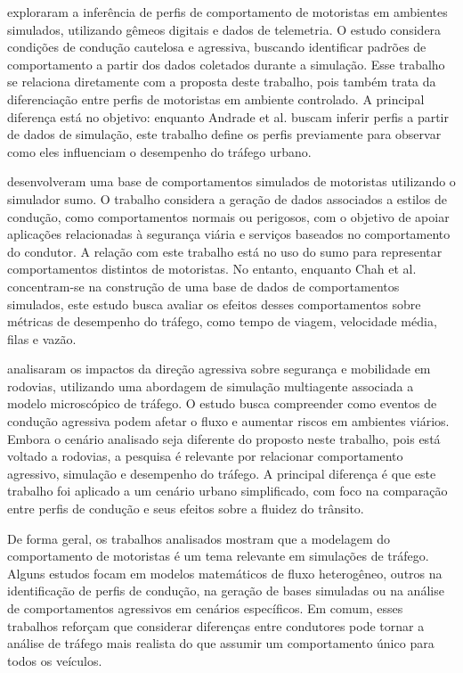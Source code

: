  exploraram a inferência de perfis de comportamento de motoristas em ambientes simulados, utilizando gêmeos digitais e dados de telemetria. O estudo considera condições de condução cautelosa e agressiva, buscando identificar padrões de comportamento a partir dos dados coletados durante a simulação. Esse trabalho se relaciona diretamente com a proposta deste trabalho, pois também trata da diferenciação entre perfis de motoristas em ambiente controlado. A principal diferença está no objetivo: enquanto Andrade et al. buscam inferir perfis a partir de dados de simulação, este trabalho define os perfis previamente para observar como eles influenciam o desempenho do tráfego urbano.

 desenvolveram uma base de comportamentos simulados de motoristas utilizando o simulador \gls{sumo}. O trabalho considera a geração de dados associados a estilos de condução, como comportamentos normais ou perigosos, com o objetivo de apoiar aplicações relacionadas à segurança viária e serviços baseados no comportamento do condutor. A relação com este trabalho está no uso do \gls{sumo} para representar comportamentos distintos de motoristas. No entanto, enquanto Chah et al. concentram-se na construção de uma base de dados de comportamentos simulados, este estudo busca avaliar os efeitos desses comportamentos sobre métricas de desempenho do tráfego, como tempo de viagem, velocidade média, filas e vazão.

 analisaram os impactos da direção agressiva sobre segurança e mobilidade em rodovias, utilizando uma abordagem de simulação multiagente associada a modelo microscópico de tráfego. O estudo busca compreender como eventos de condução agressiva podem afetar o fluxo e aumentar riscos em ambientes viários. Embora o cenário analisado seja diferente do proposto neste trabalho, pois está voltado a rodovias, a pesquisa é relevante por relacionar comportamento agressivo, simulação e desempenho do tráfego. A principal diferença é que este trabalho foi aplicado a um cenário urbano simplificado, com foco na comparação entre perfis de condução e seus efeitos sobre a fluidez do trânsito.

De forma geral, os trabalhos analisados mostram que a modelagem do comportamento de motoristas é um tema relevante em simulações de tráfego. Alguns estudos focam em modelos matemáticos de fluxo heterogêneo, outros na identificação de perfis de condução, na geração de bases simuladas ou na análise de comportamentos agressivos em cenários específicos. Em comum, esses trabalhos reforçam que considerar diferenças entre condutores pode tornar a análise de tráfego mais realista do que assumir um comportamento único para todos os veículos.

